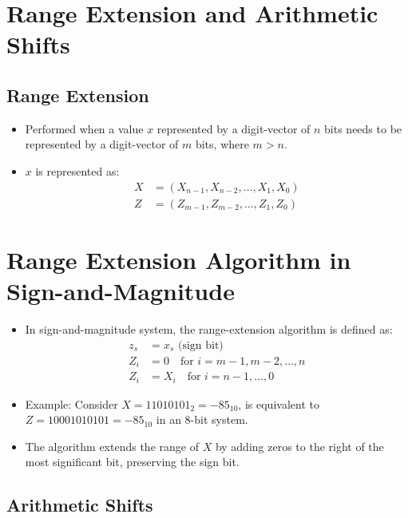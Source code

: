 \documentclass[12pt,openany]{book}
\begin{document}
	\section{Range Extension and Arithmetic Shifts}
	\subsection{Range Extension}
	
	\begin{itemize}
		\item[] Performed when a value \( x \) represented by a digit-vector of \( n \) bits needs to be represented by a digit-vector of \( m \) bits, where \( m > n \).
		\item[] \( x \) is represented as:
			  \begin{align*}
				  X & = (X_{n-1}, X_{n-2}, \ldots, X_1, X_0) \\
				  Z & = (Z_{m-1}, Z_{m-2}, \ldots, Z_1, Z_0) 
			  \end{align*}
	\end{itemize}
	
	\small \section{Range Extension Algorithm in Sign-and-Magnitude}
	\begin{itemize}
		\item[] In sign-and-magnitude system, the range-extension algorithm is defined as:
			  \begin{align*}
				  z_s & = x_s \text{ (sign bit)}                          \\
				  Z_i & = 0 \quad \text{for } i = m - 1, m - 2, \ldots, n \\
				  Z_i & = X_i \quad \text{for } i = n - 1, \ldots, 0      
			  \end{align*}
		\item[] Example: Consider \( X = 11010101_2 = -85_{10} \), is equivalent to \( Z = 10001010101 = -85_{10} \) in an 8-bit system.
	
		\item[] The algorithm extends the range of \( X \) by adding zeros to the right of the most significant bit, preserving the sign bit.
	\end{itemize}
	
	
	\subsection{Arithmetic Shifts}
	
\end{document}

